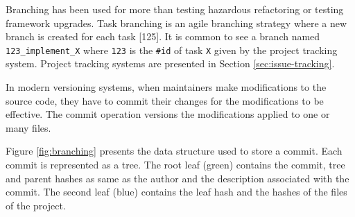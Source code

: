 \documentclass[12pt]{report}
\begin{document}
Branching has been used for more than testing hazardous refactoring or
testing framework upgrades. Task branching is an agile branching
strategy where a new branch is created for each task {[}125{]}. It is
common to see a branch named \lstinline!123_implement_X! where
\lstinline!123! is the \lstinline!#id! of task \lstinline!X! given by
the project tracking system. Project tracking systems are presented in
Section \ref{sec:issue-tracking}.

In modern versioning systems, when maintainers make modifications to the
source code, they have to commit their changes for the modifications to
be effective. The commit operation versions the modifications applied to
one or many files.

Figure \ref{fig:branching} presents the data structure used to store a
commit. Each commit is represented as a tree. The root leaf (green)
contains the commit, tree and parent hashes as same as the author and
the description associated with the commit. The second leaf (blue)
contains the leaf hash and the hashes of the files of the project.
\end{document}
